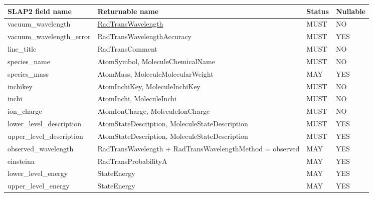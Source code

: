 \documentclass[11pt,a4paper]{ivoa}
\def\vamdcretlink#1{\href{https://dictionary.vamdc.eu/returnables/\##1}{#1}}
\begin{document}
\begin{table}[H]
\centering
\footnotesize
\begin{tabularx}{\textwidth}{|p{4cm}|>{\raggedright\arraybackslash}X|p{2.3cm}|p{1.5cm}|}
\hline
\textbf{\headerstrut SLAP2 field name} & \textbf{Returnable name} & \textbf{Status} & \textbf{Nullable} \\
\hline
vacuum\_wavelength                     & \vamdcretlink{RadTransWavelength}                             & MUST    &  NO   \\
vacuum\_wavelength\_error              & RadTransWavelength\-Accuracy                                    & MUST    &  YES  \\
line\_title                            & RadTransComment                                               & MUST    &  NO   \\
species\_name                          & AtomSymbol, Molecule\-Chemical\-Name                              & MUST    &  NO   \\
species\_mass                          & AtomMass, Molecule\-Molecular\-Weight                             & MAY     &  YES  \\
inchikey                               & Atom\-Inchi\-Key, Molecule\-Inchi\-Key                            & MUST    &  NO   \\
inchi                                  & AtomInchi, MoleculeInchi                                      & MUST    &  NO   \\
ion\_charge                            & Atom\-Ion\-Charge, Molecule\-Ion\-Charge                          & MUST    &  NO   \\
lower\_level\_description              & Atom\-State\-Description, Molecule\-State\-Description            & MUST    &  YES  \\
upper\_level\_description              & Atom\-State\-Description, Molecule\-State\-Description            & MUST    &  YES  \\
observed\_wavelength                   & RadTrans\-Wavelength + RadTrans\-Wavelength\-Method = observed    & MAY     &  YES  \\
einsteina                              & RadTransProbabilityA                                          & MAY     &  YES  \\
lower\_level\_energy                   & StateEnergy                                                   & MAY     &  YES  \\
upper\_level\_energy                   & StateEnergy                                                   & MAY     &  YES  \\

\end{tabularx}
\end{table}
\end{document}

